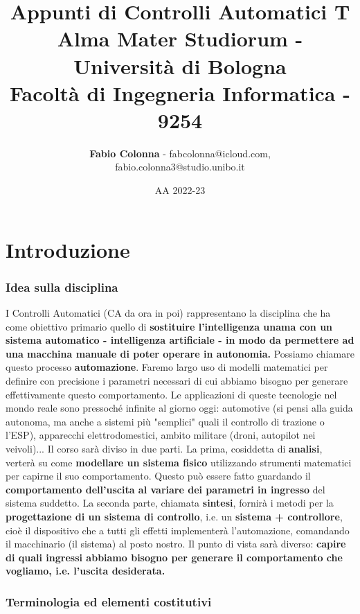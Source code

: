 \documentclass[a4paper]{report}
\title{
    \textbf{Appunti di Controlli Automatici T} \\
       \large Alma Mater Studiorum - Università di Bologna \\
    \large Facoltà di Ingegneria Informatica - 9254
}
\author{\textbf{Fabio Colonna} - fabcolonna@icloud.com, \\
        fabio.colonna3@studio.unibo.it }
\date{AA 2022-23}
\begin{document}
\maketitle
\tableofcontents
\newpage

\part{Introduzione}

\section{Idea sulla disciplina}

I Controlli Automatici (CA da ora in poi) rappresentano la disciplina che ha come obiettivo primario quello di \textbf{sostituire l'intelligenza unama con un sistema automatico - intelligenza artificiale - in modo da permettere ad una macchina manuale di poter operare in autonomia.} Possiamo chiamare questo processo \textbf{automazione}. Faremo largo uso di modelli matematici per definire con precisione i parametri necessari di cui abbiamo bisogno per generare effettivamente questo comportamento. Le applicazioni di queste tecnologie nel mondo reale sono pressoché infinite al giorno oggi: automotive (si pensi alla guida autonoma, ma anche a sistemi più "semplici" quali il controllo di trazione o l'ESP), apparecchi elettrodomestici, ambito militare (droni, autopilot nei veivoli)...
\bb
Il corso sarà diviso in due parti. La prima, cosiddetta di \textbf{analisi}, verterà su come \textbf{modellare un sistema fisico} utilizzando strumenti matematici per capirne il suo comportamento. Questo può essere fatto guardando il \textbf{comportamento dell'uscita al variare dei parametri in ingresso} del sistema suddetto. La seconda parte, chiamata \textbf{sintesi}, fornirà i metodi per la \textbf{progettazione di un sistema di controllo}, i.e. un \textbf{sistema + controllore}, cioè il dispositivo che a tutti gli effetti implementerà l'automazione, comandando il macchinario (il sistema) al posto nostro. Il punto di vista sarà diverso: \textbf{capire di quali ingressi abbiamo bisogno per generare il comportamento che vogliamo, i.e. l'uscita desiderata.}

\section{Terminologia ed elementi costitutivi}
\end{document}
